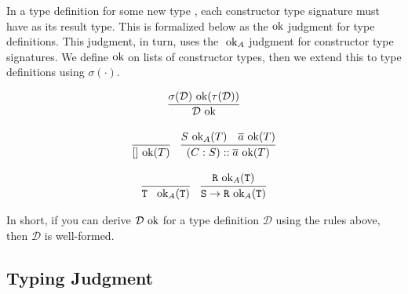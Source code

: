 \documentclass[10pt]{article}
\begin{document}
In a type definition for some new type , each constructor type signature must have  as its result type. This is
formalized below as the$\textnormal{ ok}$ judgment for type definitions. This judgment, in turn, uses the $\textnormal{ ok}_A$ judgment for constructor
type signatures. We define$\textnormal{ ok}$ on lists of constructor types, then we extend this to type definitions using $\sigma(\cdot)$.

\[
  \begin{array}{c}
    \infer{\mathcal{D} \ok}{\sigma(\mathcal{D}) \ok(\tau(\mathcal{D}))}
    \\\\

    \infer{[] \ok(T)}{}
    ~~~
    \infer{(C : S) :: \overline{a} \ok(T)}{S \ok_A(T) & \overline{a} \ok(T) }
    \\\\
    \infer{\ttt{T }\ok_A(\ttt{T})}{}
    ~~~
    \infer{\ttt{S} \ra \ttt{R} \ok_A(\ttt{T})}{\ttt{R} \ok_A(\ttt{T})}
  \end{array}
\]

\noindent
In short, if you can derive $\mathcal{D}\textnormal{ ok}$ for a type definition $\mathcal{D}$ using the rules above, then $\mathcal{D}$ is well-formed.

\subsection{Typing Judgment}
\end{document}
